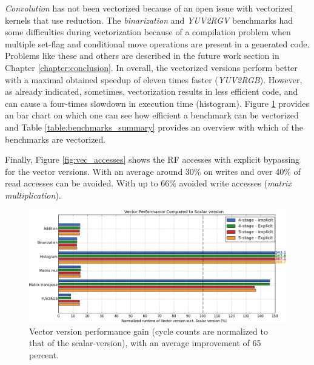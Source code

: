 \emph{Convolution} has not been vectorized because of an open issue with vectorized kernels that use reduction. The \emph{binarization} and \emph{YUV2RGV} benchmarks had some difficulties during vectorization because of a compilation problem when multiple set-flag and conditional move operations are present in a generated code. Problems like these and others are described in the future work section in Chapter \ref{chapter:conclusion}. In overall, the vectorized versions perform better with a maximal obtained speedup of eleven times faster (\emph{YUV2RGB}). However, as already indicated, sometimes, vectorization results in less efficient code, and can cause a four-times slowdown in execution time (histogram). Figure \ref{fig:vector_scalar_cmp} provides an bar chart on which one can see how efficient a benchmark can be vectorized and Table \ref{table:benchmarks_summary} provides an overview with which of the benchmarks are vectorized.

Finally, Figure \ref{fig:vec_accesses} shows the RF accesses with explicit bypassing for the vector versions. With an average around 30\% on writes and over 40\% of read accesses can be avoided. With up to 66\% avoided write accesses (\emph{matrix multiplication}).

\begin{figure}[t!]
\centering
\hspace*{-.12in}
\includegraphics[width=\textwidth]{figures/stats/vector_cycles}
\caption{Vector version performance gain (cycle counts are normalized to that of the scalar-version), with an average improvement of 65 percent.}
\label{fig:vector_scalar_cmp}
\end{figure}


